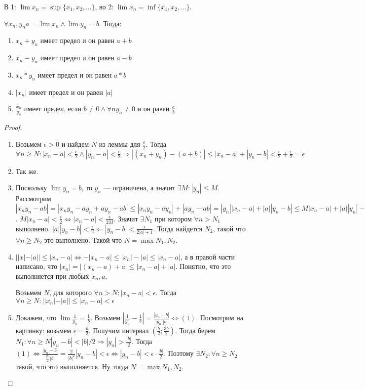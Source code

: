 \begin{remark}
    В 1: $\lim x_n = \sup\{x_1,x_2,\ldots\}$, во 2: $\lim x_n = \inf\{x_1,x_2,\ldots\}$.
\end{remark}
\begin{theorem}
    $\forall x_n, y_n a = \lim x_n \land \lim y_n = b$. Тогда: 
     \begin{enumerate}
         \item $x_n+y_n$ имеет предел и он равен  $a+b$
         \item $x_n-y_n$ имеет предел и он равен  $a-b$
         \item $x_n*y_n$ имеет предел и он равен  $a*b$
         \item $|x_n|$ имеет предел и он равен  $|a|$
         \item $\frac{x_n}{y_n}$ имеет предел, если $b \neq 0 \land \forall n y_n \neq 0$ и он  равен  $\frac{a}{b}$
    \end{enumerate}
\end{theorem}
\begin{proof}
    \slashn
    \begin{enumerate}
        \item Возьмем $\epsilon > 0$ и найдем  $N$ из леммы для  $\frac{\epsilon}{2}$. Тогда $\forall n \ge N: |x_n-a| < \frac{\epsilon}{2} \land |y_n-a| <  \frac{\epsilon}{2} \Rightarrow |(x_n+y_n) - (a+b)| \le |x_n - a| + |y_n-b| < \frac{\epsilon}{2} + \frac{\epsilon}{2} = \epsilon$
        \item Так же.
        \item Поскольку $\lim y_n = b$, то $y_n$ --- ограничена, а значит  $\exists M: |y_n| \le M$. Рассмотрим $|x_ny_n - ab| = |x_ny_n - ay_n + ay_n - ab| \le |x_ny_n - ay_n| + |ay_n - ab| = |y_n| |x_n-a| + |a| |y_n-b| \le M |x_n-a| + |a| |y_n|-b$. $M |x_n - a| < \frac{\epsilon}{2} \iff |x_n - a| < \frac{\epsilon}{2M}$. Значит $\exists N_1$ при котором $\forall n > N_1$ выполнено.  $|a| |y_n - b| < \frac{\epsilon}{2} \Leftarrow |y_n - b| < \frac{\epsilon}{2|a|+1}$. Тогда найдется $N_2$, такой что  $\forall n \ge N_2$ это выполнено. Такой что $N = \max{N_1, N_2}$.
        \item $||x|-|a|| \le |x_n-a| \iff -|x_n-a| \le |x_n| - |a| \le |x_n-a|$, а в правой части написано, что $|x_n| = |(x_n-a)+a| \le |x_n-a| + |a|$. Понятно, что это выполняется при любых $x_n, a$. 

            Возьмем  $N$, для которого  $\forall n > N: |x_n - a| < \epsilon$. Тогда  $\forall n \ge N: ||x_n|-|a|| \le |x_n-a| < \epsilon$
        \item Докажем, что $\lim \frac{1}{y_n} = \frac{1}{b}$.  Возьмем  $|\frac{1}{y_n} - \frac{1}{b}| = \frac{|y_n-b|}{|y_n||b|} \iff (1)$. Посмотрим на картинку: возьмем $\epsilon = \frac{b}{2}$. Получим интервал $(\frac{b}{2}; \frac{3b}{2})$. Тогда берем $N_1: \forall n \ge N |y_n-b| < |b|/2 \Rightarrow |y_n| > \frac{|b|}{2}$. Тогда $(1) \iff \frac{|y_n-b|}{\frac{|b|}{2}|b|} = \frac{2}{|b|^2}|y_n-b|<\epsilon \iff |y_n-b| < \epsilon \cdot \frac{|b|}{2}$. Поэтому $\exists N_2: \forall n \ge N_2$ такой, что это выполняется. Ну тогда $N=\max{N_1, N_2}$.
    \end{enumerate}
\end{proof}
